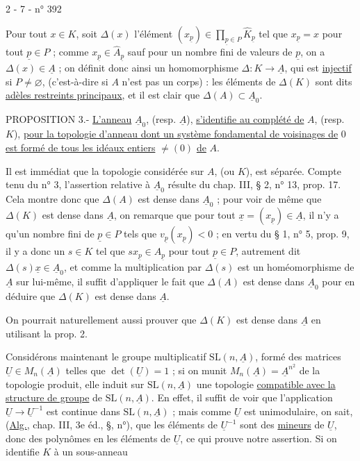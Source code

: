 2 - 7 - \hfill n° 392

Pour tout $x\in K$, soit $\Delta(x)$ l'élément $(x_{\underline p})\in\prod_{\underline p\in P}\hat K_{\underline p}$ tel que $x_{\underline p}=x$ pour tout $\underline p\in P$ ; comme $x_{\underline p}\in\hat A_{\underline p}$ sauf pour un nombre fini de valeurs de $\underline p$, on a $\Delta(x)\in\underline A$ ; on définit donc ainsi un homomorphisme $\Delta:K\longrightarrow\underline A$, qui est \uline{injectif} si $P\ne\varnothing$, (c'est-à-dire si $A$ n'est pas un corps) : les éléments de $\Delta(K)$ sont dits \uline{adèles restreints principaux}, et il est clair que $\Delta(A)\subset\underline A_0$.

PROPOSITION 3.- \uline{L'anneau} $\underline A_0$, (resp. $\underline A$), \uline{s'identifie au complété de} $A$, (resp. $K$), \uline{pour la topologie d'anneau dont un système fondamental de voisinages de} $0$ \uline{est formé de tous les idéaux entiers} $\ne(0)$ \uline{de} $A$.

Il est immédiat que la topologie considérée sur $A$, (ou $K$), est séparée. Compte tenu du n° 3, l'assertion relative à $\underline A_0$ résulte du chap. III, § 2, n° 13, prop. 17. Cela montre donc que $\Delta(A)$ est dense dans $\underline A_0$ ; pour voir de même que $\Delta(K)$ est dense dans $\underline A$, on remarque que pour tout $\underline x=(x_{\underline p})\in\underline A$, il n'y a qu'un nombre fini de $\underline p\in P$ tels que $v_{\underline p}(x_{\underline p})<0$ ; en vertu du § 1, n° 5, prop. 9, il y a donc un $s\in K$ tel que $sx_{\underline p}\in\hat A_{\underline p}$ pour tout $\underline p\in P$, autrement dit $\Delta(s)\underline x\in\underline A_0$, et comme la multiplication par $\Delta(s)$ est un homéomorphisme de $\underline A$ sur lui-même, il suffit d'appliquer le fait que $\Delta(A)$ est dense dans $\underline A_0$ pour en déduire que $\Delta(K)$ est dense dans $\underline A$.

On pourrait naturellement aussi prouver que $\Delta(K)$ est dense dans $\underline A$ en utilisant la prop. 2.

Considérons maintenant le groupe multiplicatif $\mathrm{SL}(n,\underline A)$, formé des matrices $\underline U\in M_n(\underline A)$ telles que $\det(\underline U)=1$ ; si on munit $M_n(\underline A)=\underline A^{n^2}$ de la topologie produit, elle induit sur $\mathrm{SL}(n,\underline A)$ une topologie \uline{compatible avec la structure de groupe} de $\mathrm{SL}(n,\underline A)$. En effet, il suffit de voir que l'application $\underline U\longrightarrow\underline U^{-1}$ est continue dans $\mathrm{SL}(n,\underline A)$ ; mais comme $\underline U$ est unimodulaire, on sait, (\uline{Alg.}, chap. III, 3e éd., §\quad, n°\quad), que les éléments de $\underline U^{-1}$ sont des \uline{mineurs} de $\underline U$, donc des polynômes en les éléments de $\underline U$, ce qui prouve notre assertion. Si on identifie $K$ à un sous-anneau
